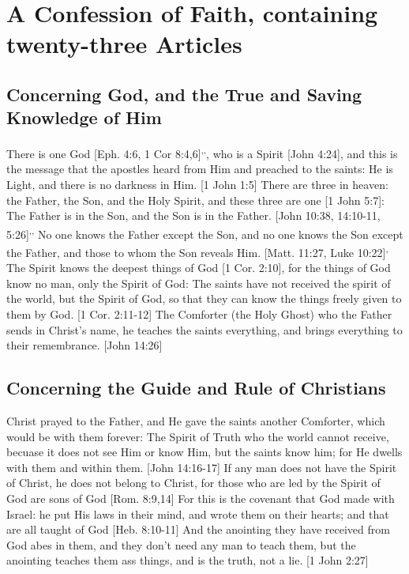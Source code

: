 \documentclass[../main.tex]{subfiles}
\begin{document}
	
	\chapter*{A Confession of Faith, containing twenty-three Articles}
	
	\section{Concerning God, and the True and Saving Knowledge of Him}

	There is one God [Eph. 4:6, 1 Cor 8:4,6]\textsuperscript{,}\textsuperscript{,}, who is a Spirit [John 4:24], and this is the message that the apostles heard from Him and preached to the saints: He is Light, and there is no darkness in Him. [1 John 1:5] There are three in heaven: the Father, the Son, and the Holy Spirit, and these three are one [1 John 5:7]: The Father is in the Son, and the Son is in the Father. [John 10:38, 14:10-11, 5:26]\textsuperscript{,}\textsuperscript{,} No one knows the Father except the Son, and no one knows the Son except the Father, and those to whom the Son reveals Him. [Matt. 11:27, Luke 10:22]\textsuperscript{,} The Spirit knows the deepest things of God [1 Cor. 2:10], for the things of God know no man, only the Spirit of God: The saints have not received the spirit of the world, but the Spirit of God, so that they can know the things freely given to them by God. [1 Cor. 2:11-12] The Comforter (the Holy Ghost) who the Father sends in Christ's name, he teaches the saints everything, and brings everything to their remembrance. [John 14:26]

	\section{Concerning the Guide and Rule of Christians}

	Christ prayed to the Father, and He gave the saints another Comforter, which would be with them forever: The Spirit of Truth who the world cannot receive, becuase it does not see Him or know Him, but the saints know him; for He dwells with them and within them. [John 14:16-17] If any man does not have the Spirit of Christ, he does not belong to Christ, for those who are led by the Spirit of God are sons of God [Rom. 8:9,14] For this is the covenant that God made with Israel: he put His laws in their mind, and wrote them on their hearts; and that are all taught of God [Heb. 8:10-11] And the anointing they have received from God abes in them, and they don't need any man to teach them, but the anointing teaches them ass things, and is the truth, not a lie. [1 John 2:27]
\end{document}
